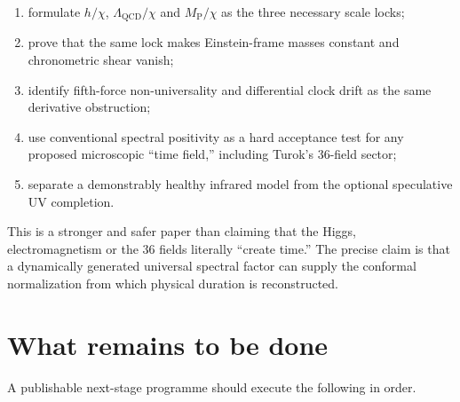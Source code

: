 \documentclass[11pt,a4paper]{article}
\newcommand{\MP}{M_{\mathrm P}}
\newcommand{\QCD}{\mathrm{QCD}}
\begin{document}
\begin{enumerate}
  \item formulate $h/\chi$, $\Lambda_{\QCD}/\chi$ and $\MP/\chi$ as the three necessary scale locks;
  \item prove that the same lock makes Einstein-frame masses constant and chronometric shear vanish;
  \item identify fifth-force non-universality and differential clock drift as the same derivative obstruction;
  \item use conventional spectral positivity as a hard acceptance test for any proposed microscopic ``time field,'' including Turok's 36-field sector;
  \item separate a demonstrably healthy infrared model from the optional speculative UV completion.
\end{enumerate}

This is a stronger and safer paper than claiming that the Higgs, electromagnetism or the 36 fields literally ``create time.'' The precise claim is that a dynamically generated universal spectral factor can supply the conformal normalization from which physical duration is reconstructed.

\section{What remains to be done}

A publishable next-stage programme should execute the following in order.
\end{document}
